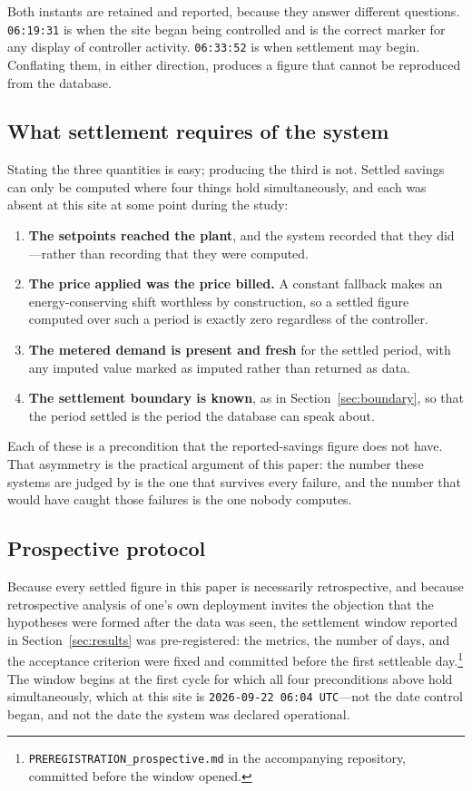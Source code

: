 Both instants are retained and reported, because they answer different
questions. \texttt{06:19:31} is when the site began being controlled and is
the correct marker for any display of controller activity.
\texttt{06:33:52} is when settlement may begin. Conflating them, in either
direction, produces a figure that cannot be reproduced from the database.

\subsection{What settlement requires of the system}

Stating the three quantities is easy; producing the third is not. Settled
savings can only be computed where four things hold simultaneously, and each
was absent at this site at some point during the study:

\begin{enumerate}
\item \textbf{The setpoints reached the plant}, and the system recorded that
they did---rather than recording that they were computed.
\item \textbf{The price applied was the price billed.} A constant fallback
makes an energy-conserving shift worthless by construction, so a settled figure
computed over such a period is exactly zero regardless of the controller.
\item \textbf{The metered demand is present and fresh} for the settled period,
with any imputed value marked as imputed rather than returned as data.
\item \textbf{The settlement boundary is known}, as in
Section~\ref{sec:boundary}, so that the period settled is the period the
database can speak about.
\end{enumerate}

Each of these is a precondition that the reported-savings figure does not
have. That asymmetry is the practical argument of this paper: the number these
systems are judged by is the one that survives every failure, and the number
that would have caught those failures is the one nobody computes.

\subsection{Prospective protocol}

Because every settled figure in this paper is necessarily retrospective, and
because retrospective analysis of one's own deployment invites the objection
that the hypotheses were formed after the data was seen, the settlement window
reported in Section~\ref{sec:results} was pre-registered: the metrics, the
number of days, and the acceptance criterion were fixed and committed before
the first settleable day.\footnote{\texttt{PREREGISTRATION\_prospective.md} in
the accompanying repository, committed before the window opened.} The window
begins at the first cycle for which all four preconditions above hold
simultaneously, which at this site is \texttt{2026-09-22 06:04~UTC}---not the
date control began, and not the date the system was declared operational.
